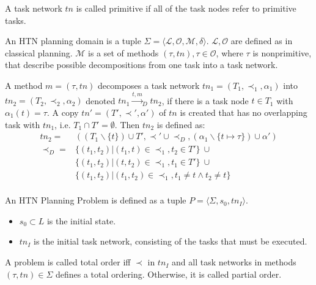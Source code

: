 A task network $tn$ is called primitive if all of the task nodes refer to primitive tasks. 

\begin{definition}
  An \ac{HTN} planning domain is a tuple $\Sigma=\langle \mathcal{L}, \mathcal{O}, \mathcal{M}, \delta \rangle$.
  $\mathcal{L},\mathcal{O}$ are defined as in classical planning. 
  $\mathcal{M}$ is a set of methods $(\tau,tn), \tau \in \mathcal{O}$, where $\tau$ is nonprimitive, that describe possible decompositions from one task into a task network.
\end{definition}


\begin{definition}
  A method $m = (\tau,tn)$ decomposes a task network $tn_1 = (T_1,\prec_1,\alpha_1)$ into $tn_2 = (T_2,\prec_2,\alpha_2)$ denoted $tn_1 \xrightarrow{t,m}_D tn_2$, if there is a task node $t \in T_1$ with $\alpha_1(t) = \tau$.
  A copy $tn' = (T',\prec',\alpha')$ of $tn$ is created that has no overlapping task with $tn_1$, i.e. $T_1 \cap T' = \emptyset$.
  Then $tn_2$ is defined as:
  \begin{align*}
    tn_2 = & ((T_1 \backslash  \{t\}) \cup T', \prec' \cup \prec_D, (\alpha_1 \backslash \{t \mapsto \tau\}) \cup \alpha') \\
    \prec_D = & \{(t_1, t_2) | (t_1, t) \in \prec_1, t_2 \in T'\}~ \cup \\
    & \{(t_1, t_2) | (t, t_2) \in \prec_1, t_1 \in T '\}~ \cup \\
    & \{(t_1, t_2) | (t_1, t_2) \in \prec_1, t_1 \neq t \land t_2 \neq t\}\\
  \end{align*}
  \label{def:htn-task-dec}
\end{definition}

\begin{definition}
  An \ac{HTN} Planning Problem is defined as a tuple $P=\langle \Sigma, s_0, tn_I \rangle$.
  \begin{itemize}
    \item $s_0 \subset L$ is the initial state.
    \item $tn_I$ is the initial task network, consisting of the tasks that must be executed.
  \end{itemize}
  A problem is called total order iff $\prec$ in $tn_I$ and all task networks in methods $(\tau,tn) \in \Sigma$ defines a total ordering.
  Otherwise, it is called partial order. 
\end{definition}


